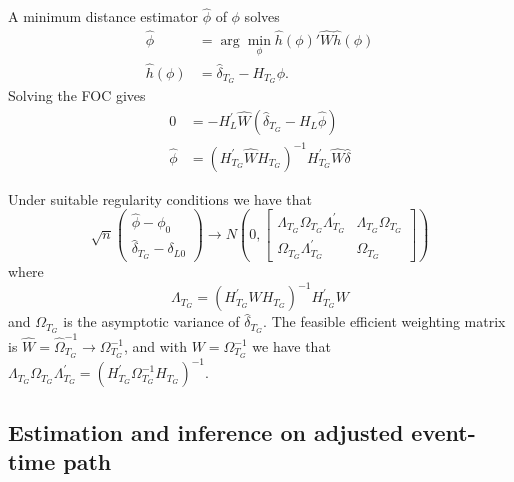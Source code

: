 \documentclass[bib]{./sty/statapress}
\begin{document}
A minimum distance estimator $\hat{\phi}$ of $\phi$ solves
\begin{align*}
\hat{\phi} & =\arg\min_{\phi}\hat{h}\left(\phi\right)'\hat{W}\hat{h}\left(\phi\right)\\
\hat{h}\left(\phi\right) & =\widehat{\delta}_{T_G}-H_{T_G}\phi.
\end{align*}
Solving the FOC gives
\[
\begin{array}{rl}
0 & =-H_{L}^{\prime}\widehat{W}(\widehat{\delta}_{T_G}-H_{L}\widehat{\phi})\\
\widehat{\phi} & =(H_{T_G}^{\prime}\widehat{W}H_{T_G})^{-1}H_{T_G}^{\prime}\widehat{W}\widehat{\delta}
\end{array}
\]

Under suitable regularity conditions we have that
\[
\sqrt{n}\left(\begin{array}{c}
\widehat{\phi}-\phi_{0}\\
\widehat{\delta}_{T_G}-\delta_{L0}
\end{array}\right)\to N\left(0,\begin{bmatrix}\Lambda_{T_G}\Omega_{T_G}\Lambda_{T_G}^{\prime} & \Lambda_{T_G}\Omega_{T_G}\\
\Omega_{T_G}\Lambda_{T_G}^{\prime} & \Omega_{T_G}
\end{bmatrix}\right)
\]
where
\[
\Lambda_{T_G}=(H_{T_G}^{\prime}WH_{T_G})^{-1}H_{T_G}^{\prime}W
\]
and $\Omega_{T_G}$ is the asymptotic variance of $\widehat{\delta}_{T_G}$.
The feasible efficient weighting matrix is $\widehat{W}=\widehat{\Omega}_{T_G}^{-1}\to\Omega_{T_G}^{-1}$,
and with $W=\Omega_{T_G}^{-1}$ we have that $\Lambda_{T_G}\Omega_{T_G}\Lambda_{T_G}^{\prime}=(H_{T_G}^{\prime}\Omega_{T_G}^{-1}H_{T_G})^{-1}.$

\subsection{Estimation and inference on adjusted event-time path}
\end{document}

